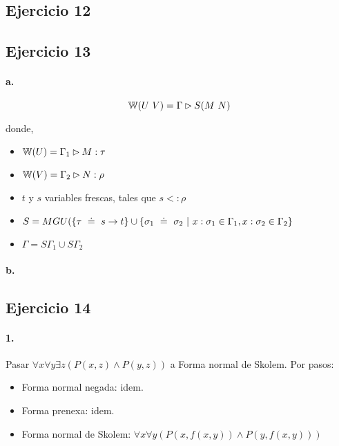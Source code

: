 
\subsection*{Ejercicio 12}


\subsection*{Ejercicio 13}

\paragraph{a.}

\[\w{U\ V} = \Gamma \rhd S(M\ N)\]

donde,

\begin{itemize}
  \item $\mathbb{W}(U) = \Gamma_1 \rhd M : \tau$
  \item $\mathbb{W}(V) = \Gamma_2 \rhd N : \rho$
  \item $t$ y $s$ variables frescas, tales que $s <: \rho$
  \item $S = MGU(\{\tau \uni s\to t\} \cup \{\sigma_1 \uni \sigma_2 \vert x:\sigma_1 \in \Gamma_1, x:\sigma_2 \in \Gamma_2\}$
  \item $\Gamma = S\Gamma_1 \cup S\Gamma_2$
\end{itemize}


\paragraph{b.}


\subsection*{Ejercicio 14}

\paragraph{1.}

Pasar $\forall x\forall y\exists z (P(x,z)\land P(y,z))$ a Forma normal de Skolem. Por pasos:

\begin{itemize}
  \item Forma normal negada: idem.
  \item Forma prenexa: idem.
  \item Forma normal de Skolem: $\forall x\forall y (P(x,f(x,y))\land P(y,f(x,y)))$
\end{itemize}

